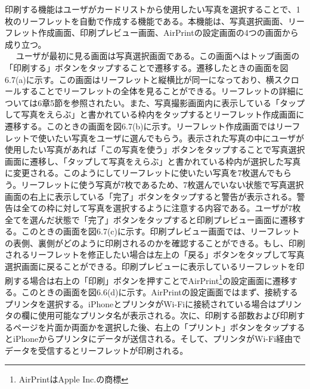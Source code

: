 印刷する機能はユーザがカードリストから使用したい写真を選択することで、1枚のリーフレットを自動で作成する機能である。本機能は、写真選択画面、リーフレット作成画面、印刷プレビュー画面、AirPrintの設定画面の4つの画面から成り立つ。\\　
ユーザが最初に見る画面は写真選択画面である。この画面へはトップ画面の「印刷する」ボタンをタップすることで遷移する。遷移したときの画面を図6.7(a)に示す。この画面はリーフレットと縦横比が同一になっており、横スクロールすることでリーフレットの全体を見ることができる。リーフレットの詳細については6章5節を参照されたい。また、写真撮影画面内に表示している「タップして写真をえらぶ」と書かれている枠内をタップするとリーフレット作成画面に遷移する。このときの画面を図6.7(b)に示す。リーフレット作成画面ではリーフレットで使いたい写真をユーザに選んでもらう。表示された写真の中にユーザが使用したい写真があれば「この写真を使う」ボタンをタップすることで写真選択画面に遷移し、「タップして写真をえらぶ」と書かれている枠内が選択した写真に変更される。このようにしてリーフレットに使いたい写真を7枚選んでもらう。リーフレットに使う写真が7枚であるため、7枚選んでいない状態で写真選択画面の右上に表示している「完了」ボタンをタップすると警告が表示される。警告は全ての枠に対して写真を選択するように注意する内容である。ユーザが7枚全てを選んだ状態で「完了」ボタンをタップすると印刷プレビュー画面に遷移する。このときの画面を図6.7(c)に示す。印刷プレビュー画面では、リーフレットの表側、裏側がどのように印刷されるのかを確認することができる。もし、印刷されるリーフレットを修正したい場合は左上の「戻る」ボタンをタップして写真選択画面に戻ることができる。印刷プレビューに表示しているリーフレットを印刷する場合は右上の「印刷」ボタンを押すことでAirPrint\footnote{AirPrintはApple Inc.の商標}の設定画面に遷移する。このときの画面を図6.6(d)に示す。AirPrintの設定画面ではまず、接続するプリンタを選択する。iPhoneとプリンタがWi-Fiに接続されている場合はプリンタの欄に使用可能なプリンタ名が表示される。次に、印刷する部数および印刷するページを片面か両面かを選択した後、右上の「プリント」ボタンをタップするとiPhoneからプリンタにデータが送信される。そして、プリンタがWi-Fi経由でデータを受信するとリーフレットが印刷される。
